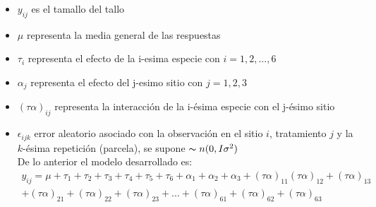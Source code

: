 \documentclass[12pt,a4paper]{report}
\begin{document}
\begin{enumerate}
\begin{itemize}
\begin{verbatim}
Coefficients:
                      Estimate Std. Error t value Pr(>|t|)    
(Intercept)             94.000      2.779  33.823  < 2e-16 ***
tratHa                 -49.600      3.930 -12.620  < 2e-16 ***
tratTa                 -54.800      3.930 -13.943  < 2e-16 ***
tratVf                 -48.200      3.930 -12.264  < 2e-16 ***
tratVg                  14.400      3.930   3.664 0.000475 ***
tratVk                 -28.000      3.930  -7.124 6.95e-10 ***
sitiosPaniagua         -91.250      4.169 -21.889  < 2e-16 ***
sitiosQuesada          -65.600      3.930 -16.691  < 2e-16 ***
tratHa:sitiosPaniagua   68.250      5.729  11.912  < 2e-16 ***
tratTa:sitiosPaniagua   74.250      5.729  12.959  < 2e-16 ***
tratVf:sitiosPaniagua   46.650      5.729   8.142 9.11e-12 ***
tratVg:sitiosPaniagua    2.650      5.729   0.463 0.645119    
tratVk:sitiosPaniagua   42.650      5.729   7.444 1.79e-10 ***
tratHa:sitiosQuesada    29.200      5.558   5.253 1.49e-06 ***
tratTa:sitiosQuesada    58.400      5.558  10.507 4.15e-16 ***
tratVf:sitiosQuesada    66.200      5.558  11.910  < 2e-16 ***
tratVg:sitiosQuesada   -25.000      5.558  -4.498 2.62e-05 ***
tratVk:sitiosQuesada    24.200      5.558   4.354 4.41e-05 ***
---
Signif. codes:  0 ‘***’ 0.001 ‘**’ 0.01 ‘*’ 0.05 ‘.’ 0.1 ‘ ’ 1

Residual standard error: 6.214 on 71 degrees of freedom
Multiple R-squared:  0.9629,	Adjusted R-squared:  0.954 
F-statistic: 108.3 on 17 and 71 DF,  p-value: < 2.2e-16
\end{verbatim} 
\[Y_{ijkl}= \mu + \tau_i + \alpha_j + (\tau\alpha)_{ij}) + \epsilon_{ijkl}\]
Dónde: 
\item[*] $y_{ij}$ es el tamallo del tallo
\item[*]$\mu$ representa la media general de las respuestas
\item[*]$\tau_i$ representa el efecto de la i-esima especie con $i=1,2,...,6$
\item[*]$\alpha_j$ representa el efecto del j-esimo sitio con $j=1, 2, 3$
\item[*]$(\tau\alpha)_{ij}$ representa la interacción de la i-ésima especie con el j-ésimo sitio 
\item[*]$\epsilon_{ijk}$ error aleatorio asociado con la observación en el sitio \(i\), tratamiento \(j\) y la \(k\)-ésima repetición (parcela), se supone $\thicksim n (0, I\sigma^2)$\\

De lo anterior el modelo desarrollado es: \\
\begin{align*}
 y_{ij} = \mu + \tau_1 + \tau_2 + \tau_3 + \tau_4 + \tau_5 + \tau_6 + \alpha_1 + \alpha_2 + \alpha_3 + (\tau \alpha)_{11}(\tau \alpha)_{12} + (\tau \alpha)_{13}
\\ + (\tau \alpha)_{21}+ (\tau \alpha)_{22} + (\tau \alpha)_{23}+...+ (\tau \alpha)_{61}+(\tau \alpha)_{62} + (\tau \alpha)_{63}
\end{align*}



\end{itemize}
\end{enumerate}
\end{document}
